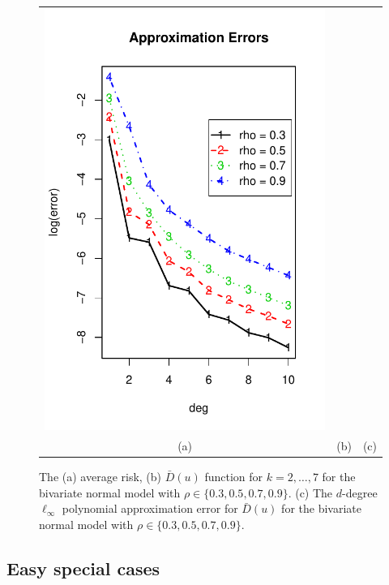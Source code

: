\documentclass[12pt]{article}
\begin{document}
\begin{figure}[h]
\begin{tabular}{ccc}
\includegraphics[scale = 0.45, clip = true, trim = 0.05in 0 0.2in 0.6in]{extrapolation_figures/illus_approx_errors.pdf}\\
(a) & (b) & (c)
\end{tabular}

\caption{
The (a) average risk, (b) $\bar{D}(u)$ function for $k = 2,\hdots, 7$ for the bivariate normal model with $\rho \in \{0.3, 0.5, 0.7, 0.9\}$.
(c) The $d$-degree $\ell_\infty$ polynomial approximation error for $\bar{D}(u)$ for the bivariate normal model with $\rho \in \{0.3, 0.5, 0.7, 0.9\}$.
}\label{fig:toy4}
\end{figure}

\subsection{Easy special cases}
\end{document}

